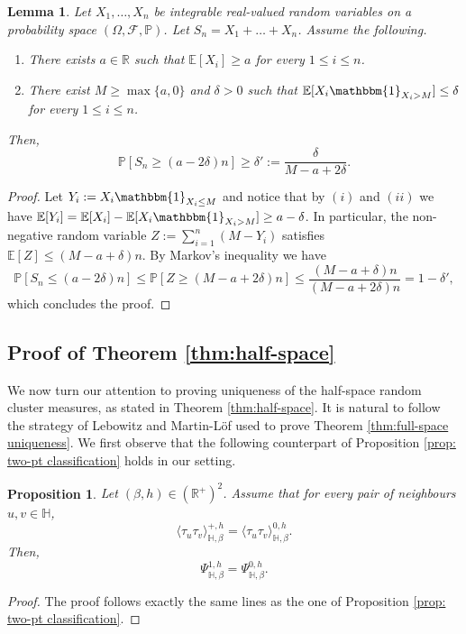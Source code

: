 \documentclass[11pt,a4paper]{article}
\numberwithin{equation}{section}
\theoremstyle{plain}
\newtheorem{Lem}[Thm]{Lemma}
\newtheorem{Prop}[Thm]{Proposition}
\theoremstyle{definition}
\begin{document}
\begin{Lem}\label{lem:random variables} Let $X_1,\ldots, X_n$ be integrable real-valued random variables on a probability space $(\Omega, \mathcal F, \mathbb P)$. Let $S_n= X_1 + \ldots +X_n$. 
Assume the following.
\begin{enumerate}
    \item[(i)] There exists $a\in\mathbb R$ such that $\mathbb E[X_i] \geq a$ for every $1 \leq i \leq n$.
    \item[(ii)] There exist $M\geq \max\{a,0\}$ and $\delta > 0$ such that $\mathbb E[X_i \mathbbm{1}_{X_i>M}]\leq \delta$ for every $1 \leq i \leq n$.
\end{enumerate}
Then,
\begin{equation}
    \mathbb P[S_n \geq (a-2\delta)n]\geq \delta':=\frac{\delta}{M-a+2\delta}.
\end{equation}

\end{Lem}
\begin{proof} Let $Y_i:=X_i\mathbbm{1}_{X_i\leq M}$ and notice that by $(i)$ and $(ii)$ we have $\mathbb E[Y_i] = \mathbb E[X_i] - \mathbb E[X_i\mathbbm{1}_{X_i>M}] \geq a-\delta$. In particular, the non-negative random variable $Z:=\sum_{i=1}^n (M-Y_i)$ satisfies $\mathbb{E} [Z]\leq (M-a+\delta)n$. By Markov's inequality we have
\begin{equation}
\mathbb P[S_n \leq (a-2\delta)n] \leq \mathbb P[Z \geq (M-a+2\delta)n ]\leq \frac{(M-a+\delta)n}{(M-a+2\delta)n}=1-\delta',
\end{equation}
which concludes the proof.
\end{proof}

\subsection{Proof of Theorem \ref{thm:half-space}}


We now turn our attention to proving uniqueness of the half-space random cluster measures, as stated in Theorem \ref{thm:half-space}. It is natural to follow the strategy of Lebowitz and Martin-L\"of used to prove Theorem \ref{thm:full-space uniqueness}. We first observe that the following counterpart of Proposition \ref{prop: two-pt classification} holds in our setting.
\begin{Prop}\label{prop: two-pt classification half-space} Let $(\beta,h)\in (\mathbb R^+)^2$. Assume that for every pair of neighbours $u,v\in \mathbb H$,
\begin{equation}
    \langle \tau_u\tau_v\rangle_{\mathbb H,\beta}^{+,h}=\langle \tau_u\tau_v\rangle_{\mathbb H,\beta}^{0,h}.
\end{equation}
Then,
\begin{equation}
    \Psi^{1,h}_{\mathbb H,\beta}=\Psi^{0,h}_{\mathbb H,\beta}.
\end{equation}
\end{Prop}
\begin{proof} The proof follows exactly the same lines as the one of Proposition \ref{prop: two-pt classification}.
\end{proof}
\end{document}
